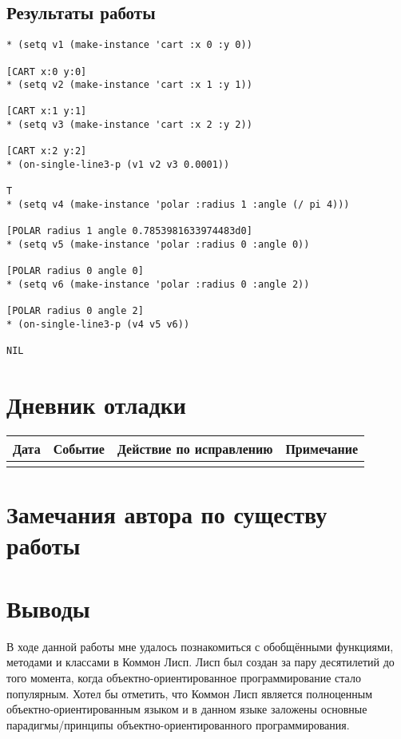 \documentclass[12pt]{article}
\begin{document}
\subsection{Результаты работы}
\begin{verbatim}
* (setq v1 (make-instance 'cart :x 0 :y 0))

[CART x:0 y:0]
* (setq v2 (make-instance 'cart :x 1 :y 1))

[CART x:1 y:1]
* (setq v3 (make-instance 'cart :x 2 :y 2))

[CART x:2 y:2]
* (on-single-line3-p (v1 v2 v3 0.0001))

T
* (setq v4 (make-instance 'polar :radius 1 :angle (/ pi 4)))

[POLAR radius 1 angle 0.7853981633974483d0]
* (setq v5 (make-instance 'polar :radius 0 :angle 0))

[POLAR radius 0 angle 0]
* (setq v6 (make-instance 'polar :radius 0 :angle 2))

[POLAR radius 0 angle 2]
* (on-single-line3-p (v4 v5 v6))

NIL
\end{verbatim}

\section{Дневник отладки}
\begin{tabular}{|p{50pt}|p{130pt}|p{130pt}|p{70pt}|}
\hline
Дата & Событие & Действие по исправлению & Примечание \\ \hline
& & &\\
\hline
\end{tabular}

\section{Замечания автора по существу работы}

\section{Выводы}
В ходе данной работы мне удалось познакомиться с обобщёнными функциями, методами и классами в Коммон Лисп. Лисп был создан за пару десятилетий до того момента, когда объектно-ориентированное программирование стало популярным. Хотел бы отметить, что Коммон Лисп является полноценным объектно-ориентированным языком и в данном языке заложены основные парадигмы/принципы объектно-ориентированного программирования.
\end{document}
